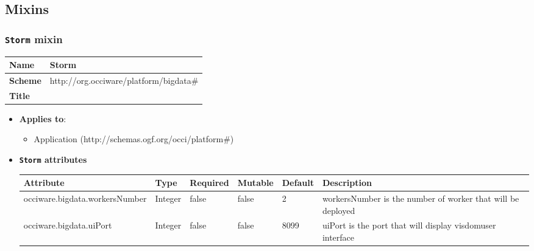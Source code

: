 \subsection{Mixins}
\subsubsection{\texttt{Storm} mixin}
\begin{center}
\begin{tabular}{|l|l|}
  \hline
  \textbf{Name} & Storm \\
  \hline  
  \textbf{Scheme} & http://org.occiware/platform/bigdata\# \\
  \hline
  \textbf{Title} &  \\
  \hline
\end{tabular}
\end{center}
\begin{itemize}
\item \textbf{Applies to}:
\begin{itemize}
	\item Application (http://schemas.ogf.org/occi/platform\#)
\end{itemize}
\end{itemize} 

\begin{itemize}
\item \textbf{\texttt{Storm} attributes}

\begin{tabularx}{\textwidth}{|l|l|p{1.4cm}|p{1.3cm}|l|X|}
  \hline
  \textbf{Attribute} & \textbf{Type} & \textbf{Required} & \textbf{Mutable} & \textbf{Default} & \textbf{Description} \\
  \hline  
  occiware.bigdata.workersNumber & Integer & false & false & 2 & workersNumber is the number of worker that will be deployed \\
  \hline
  occiware.bigdata.uiPort & Integer & false & false & 8099 & uiPort is the port that will display visdomuser interface  \\
  \hline
\end{tabularx}
\end{itemize}


 
